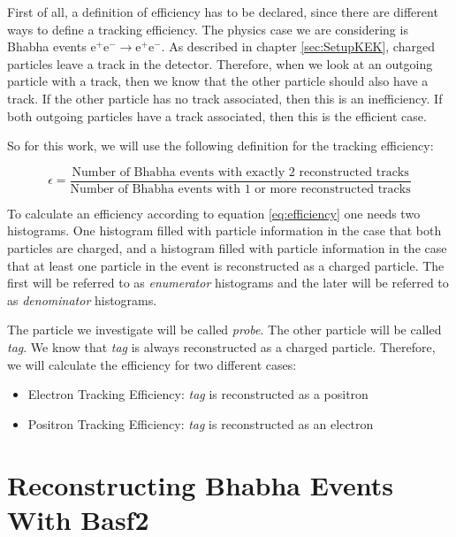 \documentclass[a4paper,11pt,twosided,final,german,openbib,pdftex,listof=totoc,bibliography=totoc]{scrbook}
\begin{document}
First of all, a definition of efficiency has to be declared, since there are different ways to define a tracking efficiency. The physics case we are considering is Bhabha events $ \textrm{e}^+ \textrm{e}^- \rightarrow \textrm{e}^+ \textrm{e}^- $. As described in chapter \ref{sec:SetupKEK}, charged particles leave a track in the detector. Therefore, when we look at an outgoing particle with a track, then we know that the other particle should also have a track. If the other particle has no track associated, then this is an inefficiency. If both outgoing particles have a track associated, then this is the efficient case.

So for this work, we will use the following definition for the tracking efficiency:

\begin{equation}
	\epsilon = \frac{\textrm{Number of Bhabha events with exactly 2 reconstructed tracks}}{\textrm{Number of Bhabha events with 1 or more reconstructed tracks}}
	\label{eq:efficiency}
\end{equation}


To calculate an efficiency according to equation \ref{eq:efficiency} one needs two histograms. One histogram filled with particle information in the case that both particles are charged, and a histogram filled with particle information in the case that at least one particle in the event is reconstructed as a charged particle. The first will be referred to as \textit{enumerator} histograms and the later will be referred to as \textit{denominator} histograms.


The particle we investigate will be called \textit{probe}. The other particle will be called \textit{tag}. We know that \textit{tag} is always reconstructed as a charged particle. Therefore, we will calculate the efficiency for two different cases:

\begin{itemize}
	
	\item Electron Tracking Efficiency: \textit{tag} is reconstructed as a positron
	\item Positron Tracking Efficiency: \textit{tag} is reconstructed as an electron
\end{itemize}

\section{Reconstructing Bhabha Events With Basf2}
\label{sec:RecBasf2}
\end{document}
